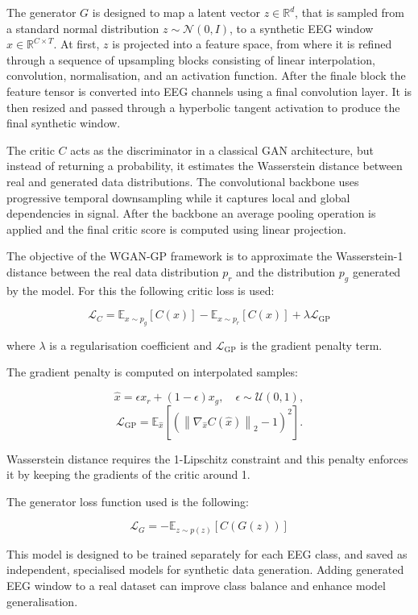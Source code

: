 The generator $G$ is designed to map a latent vector $z \in \mathbb{R}^{d}$, that is sampled from a standard normal distribution $z \sim \mathcal{N}(0, I)$, to a synthetic EEG window $\hat{x} \in \mathbb{R}^{C \times T}$. At first, $z$ is projected into a feature space, from where it is refined through a sequence of upsampling blocks consisting of linear interpolation, convolution, normalisation, and an activation function. After the finale block the feature tensor is converted into EEG channels using a final convolution layer. It is then resized and passed through a hyperbolic tangent activation to produce the final synthetic window. 

The critic $C$ acts as the discriminator in a classical GAN architecture, but instead of returning a probability, it estimates the Wasserstein distance between real and generated data distributions. The convolutional backbone uses progressive temporal downsampling while it captures local and global dependencies in signal. After the backbone an average pooling operation is applied and the final critic score is computed using linear projection. 

The objective of the WGAN-GP framework is to approximate the Wasserstein-1 distance between the real data distribution $p_r$ and the distribution $p_g$ generated by the model. For this the following critic loss is used:

\[
\mathcal{L}_C = \mathbb{E}_{x \sim p_g}[C(x)] - \mathbb{E}_{x \sim p_r}[C(x)] + \lambda \mathcal{L}_{\mathrm{GP}}
\]

where $\lambda$ is a regularisation coefficient and $\mathcal{L}_{\mathrm{GP}}$ is the gradient penalty term.

The gradient penalty is computed on interpolated samples:

\[
\hat{x} = \epsilon x_r + (1 - \epsilon)x_g, \quad \epsilon \sim \mathcal{U}(0,1),
\]
\[
\mathcal{L}_{\mathrm{GP}} = \mathbb{E}_{\hat{x}} \left[ \left( \left\| \nabla_{\hat{x}} C(\hat{x}) \right\|_2 - 1 \right)^2 \right].
\]

Wasserstein distance requires the 1-Lipschitz constraint and this penalty enforces it by keeping the gradients of the critic around 1.

The generator loss function used is the following:

\[
\mathcal{L}_G = -\mathbb{E}_{z \sim p(z)} \left[ C(G(z)) \right]
\]

This model is designed to be trained separately for each EEG class, and saved as independent, specialised models for synthetic data generation. Adding generated EEG window to a real dataset can improve class balance and enhance model generalisation.

